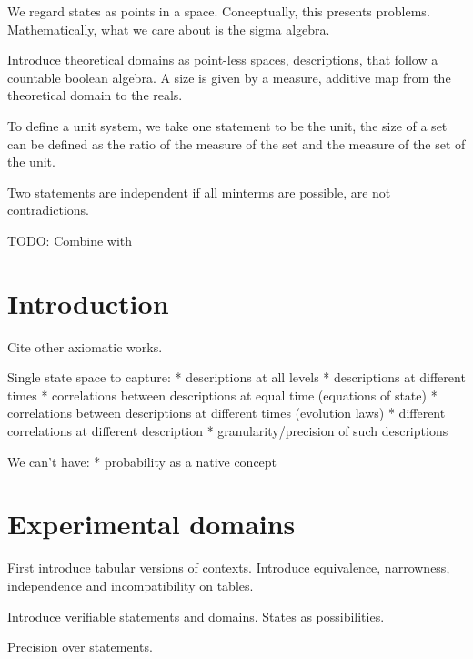 \documentclass[letterpaper]{article}
\begin{document}
We regard states as points in a space. Conceptually, this presents problems. Mathematically, what we care about is the sigma algebra.

Introduce theoretical domains as point-less spaces, descriptions, that follow a countable boolean algebra. A size is given by a measure, additive map from the theoretical domain to the reals.

To define a unit system, we take one statement to be the unit, the size of a set can be defined as the ratio of the measure of the set and the measure of the set of the unit.

Two statements are independent if all minterms are possible, are not contradictions.

TODO: Combine with

\section{Introduction}

Cite other axiomatic works.

Single state space to capture:
* descriptions at all levels
* descriptions at different times
* correlations between descriptions at equal time (equations of state)
* correlations between descriptions at different times (evolution laws)
* different correlations at different description
* granularity/precision of such descriptions

We can't have:
* probability as a native concept

\section{Experimental domains}

First introduce tabular versions of contexts. Introduce equivalence, narrowness, independence and incompatibility on tables.

Introduce verifiable statements and domains. States as possibilities.

Precision over statements.



\end{document}
